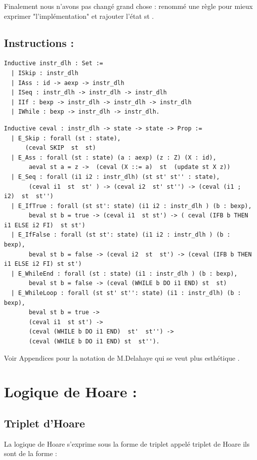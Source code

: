 \documentclass{article}
\begin{document}
\noindent Finalement nous n'avons pas changé grand chose : renommé une règle pour mieux exprimer "l'implémentation" et rajouter l'état st .  


\subsection{ Instructions  :}

\begin{lstlisting}[style=CStyle]
Inductive instr_dlh : Set :=
  | ISkip : instr_dlh
  | IAss : id -> aexp -> instr_dlh
  | ISeq : instr_dlh -> instr_dlh -> instr_dlh
  | IIf : bexp -> instr_dlh -> instr_dlh -> instr_dlh
  | IWhile : bexp -> instr_dlh -> instr_dlh.
\end{lstlisting} 
  
\begin{lstlisting}[style=CStyle]  
Inductive ceval : instr_dlh -> state -> state -> Prop :=
  | E_Skip : forall (st : state),
      (ceval SKIP  st  st)
  | E_Ass : forall (st : state) (a : aexp) (z : Z) (X : id),
       aeval st a = z ->  (ceval (X ::= a)  st  (update st X z))
  | E_Seq : forall (i1 i2 : instr_dlh) (st st' st'' : state),
       (ceval i1  st  st' ) -> (ceval i2  st' st'') -> (ceval (i1 ; i2)  st  st'')
  | E_IfTrue : forall (st st': state) (i1 i2 : instr_dlh ) (b : bexp),
       beval st b = true -> (ceval i1  st st') -> ( ceval (IFB b THEN i1 ELSE i2 FI)  st st')
  | E_IfFalse : forall (st st': state) (i1 i2 : instr_dlh ) (b : bexp),
       beval st b = false -> (ceval i2  st  st') -> (ceval (IFB b THEN i1 ELSE i2 FI) st st')
  | E_WhileEnd : forall (st : state) (i1 : instr_dlh ) (b : bexp),
       beval st b = false -> (ceval (WHILE b DO i1 END) st  st)
  | E_WhileLoop : forall (st st' st'': state) (i1 : instr_dlh) (b : bexp),
       beval st b = true -> 
       (ceval i1  st st') ->
       (ceval (WHILE b DO i1 END)  st'  st'') -> 
       (ceval (WHILE b DO i1 END) st  st'').
\end{lstlisting} 

\noindent Voir Appendices pour la notation de M.Delahaye qui se veut plus esthétique .
\pagebreak
\section{Logique de Hoare : }

\subsection{Triplet d'Hoare}
La logique de Hoare s'exprime sous la forme de triplet appelé triplet de Hoare ils sont de la forme : 
\end{document}

